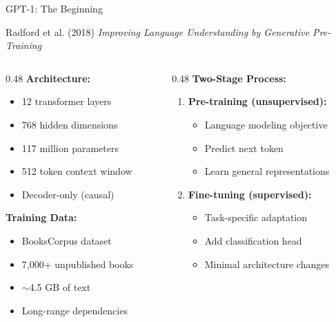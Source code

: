 \documentclass[aspectratio=169]{beamer}
\begin{document}
\begin{frame}{GPT-1: The Beginning 🌱}
\begin{block}{Radford et al. (2018)}
\textit{Improving Language Understanding by Generative Pre-Training}
\end{block}

\vspace{0.5em}

\begin{columns}[T]
\begin{column}{0.48\textwidth}
\textbf{Architecture:}
\begin{itemize}
    \item 12 transformer layers
    \item 768 hidden dimensions
    \item 117 million parameters
    \item 512 token context window
    \item Decoder-only (causal)
\end{itemize}

\vspace{0.5em}

\textbf{Training Data:}
\begin{itemize}
    \item BooksCorpus dataset
    \item 7,000+ unpublished books
    \item $\sim$4.5 GB of text
    \item Long-range dependencies
\end{itemize}
\end{column}

\begin{column}{0.48\textwidth}
\textbf{Two-Stage Process:}
\begin{enumerate}
    \item \textbf{Pre-training (unsupervised):}
    \begin{itemize}
        \item Language modeling objective
        \item Predict next token
        \item Learn general representations
    \end{itemize}

    \item \textbf{Fine-tuning (supervised):}
    \begin{itemize}
        \item Task-specific adaptation
        \item Add classification head
        \item Minimal architecture changes
    \end{itemize}
\end{enumerate}


\end{column}
\end{columns}
\end{frame}
\end{document}
